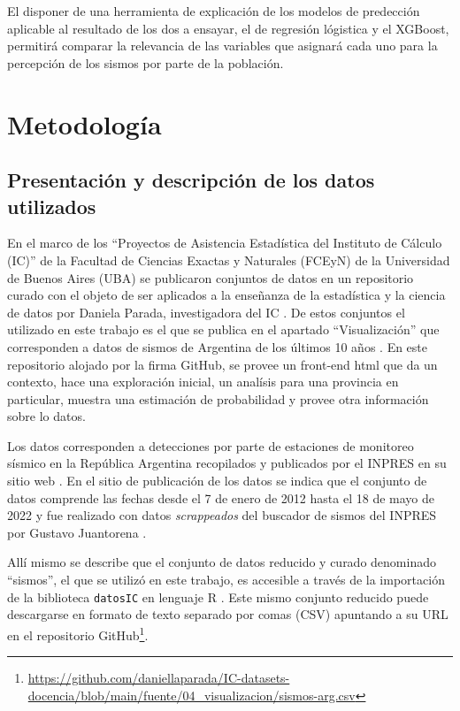 \documentclass[a4paper]{report}
\begin{document}
El disponer de una herramienta de explicación de los modelos de predección aplicable al resultado de los dos a ensayar, el de regresión lógistica y el XGBoost, permitirá comparar la relevancia de las variables que asignará cada uno para la percepción de los sismos por parte de la población.



\chapter{Metodología}

\section{Presentación y descripción de los datos utilizados}

En el marco de los ``Proyectos de Asistencia Estadística del Instituto de Cálculo (IC)'' de la Facultad de Ciencias Exactas y Naturales (FCEyN) de la Universidad de Buenos Aires (UBA) se publicaron conjuntos de datos en un repositorio curado con el objeto de ser aplicados a la enseñanza de la estadística y la ciencia de datos por Daniela Parada, investigadora del IC \cite{noauthor_ic-datasets-docencia_nodate}.
De estos conjuntos el utilizado en este trabajo es el que se publica en el apartado ``Visualización'' que corresponden a datos de sismos de Argentina de los últimos 10 años \cite{daniela_parada_ic-datasets-docencia_nodate}. 
En este repositorio alojado por la firma GitHub, se provee un front-end html que da un contexto, hace una exploración inicial, un analísis para una provincia en particular, muestra una estimación de probabilidad y provee otra información sobre lo datos.

Los datos corresponden a detecciones por parte de estaciones de monitoreo sísmico en la República Argentina recopilados y publicados por el INPRES en su sitio web \cite{noauthor_buscador_nodate}.
En el sitio de publicación de los datos se indica que el conjunto de datos comprende las fechas desde el 7 de enero de 2012 hasta el 18 de mayo de 2022 y fue realizado con datos \emph{scrappeados} del buscador de sismos del INPRES por Gustavo Juantorena \cite[sección 4.1]{daniela_parada_ic-datasets-docencia_nodate}. 

Allí mismo se describe que el conjunto de datos reducido y curado denominado ``sismos'', el que se utilizó en este trabajo, es accesible a través de la importación de la biblioteca \texttt{datosIC} en lenguaje R  \cite[sección 5.1.1]{daniela_parada_ic-datasets-docencia_nodate}.
Este mismo conjunto reducido puede descargarse en formato de texto separado por comas (CSV) apuntando a su URL en el repositorio GitHub\footnote{\url{https://github.com/daniellaparada/IC-datasets-docencia/blob/main/fuente/04_visualizacion/sismos-arg.csv}}.
\end{document}
